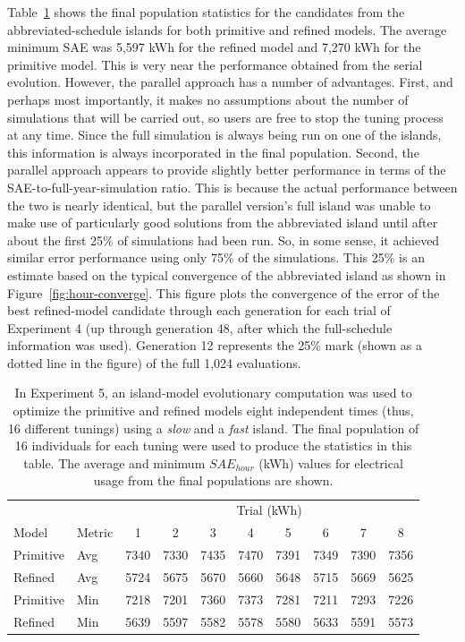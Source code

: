 \documentclass[preprint, review, 12pt]{elsarticle}
\begin{document}
Table~\ref{tab:hourly-parallel} shows the final population statistics for the candidates from the abbreviated-schedule islands for both primitive and refined models. The average minimum SAE was 5,597 kWh for the refined model and 7,270 kWh for the primitive model. This is very near the performance obtained from the serial evolution. However, the parallel approach has a number of advantages. First, and perhaps most importantly, it makes no assumptions about the number of simulations that will be carried out, so users are free to stop the tuning process at any time. Since the full simulation is always being run on one of the islands, this information is always incorporated in the final population. Second, the parallel approach appears to provide slightly better performance in terms of the SAE-to-full-year-simulation ratio. This is because the actual performance between the two is nearly identical, but the parallel version's full island was unable to make use of particularly good solutions from the abbreviated island until after about the first 25\% of simulations had been run. So, in some sense, it achieved similar error performance using only 75\% of the simulations. This 25\% is an estimate based on the typical convergence of the abbreviated island as shown in Figure~\ref{fig:hour-converge}. This figure plots the convergence of the error of the best refined-model candidate through each generation for each trial of Experiment 4 (up through generation 48, after which the full-schedule information was used). Generation 12 represents the 25\% mark (shown as a dotted line in the figure) of the full 1,024 evaluations.

\begin{table}[tbp]
\centering
\caption{In Experiment 5, an island-model evolutionary computation was used to optimize the primitive and refined models eight independent times (thus, 16 different tunings) using a \emph{slow} and a \emph{fast} island. The final population of 16 individuals for each tuning were used to produce the statistics in this table. The average and minimum $SAE_{hour}$ (kWh) values for electrical usage from the final populations are shown.}
\label{tab:hourly-parallel}
\begin{tabular}{llcccccccc}
\toprule
 &  & \multicolumn{8}{c}{Trial (kWh)}\\
Model & Metric & 1 & 2 & 3 & 4 & 5 & 6 & 7 & 8\\
\midrule
Primitive & Avg & 7340 & 7330 & 7435 & 7470 & 7391 & 7349 & 7390 & 7356\\\rowcolor{DarkRow}
Refined   & Avg & 5724 & 5675 & 5670 & 5660 & 5648 & 5715 & 5669 & 5625\\
Primitive & Min & 7218 & 7201 & 7360 & 7373 & 7281 & 7211 & 7293 & 7226\\\rowcolor{DarkRow}
Refined   & Min & 5639 & 5597 & 5582 & 5578 & 5580 & 5633 & 5591 & 5573\\
\bottomrule
\end{tabular}
\end{table}
\end{document}
